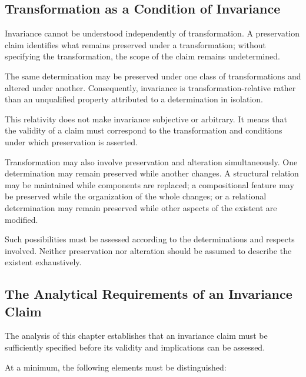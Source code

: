 \subsection{Transformation as a Condition of Invariance}

Invariance cannot be understood independently of
transformation. A preservation claim identifies what
remains preserved under a transformation; without
specifying the transformation, the scope of the
claim remains undetermined.

The same determination may be preserved under one
class of transformations and altered under another.
Consequently, invariance is transformation-relative
rather than an unqualified property attributed to
a determination in isolation.

This relativity does not make invariance subjective
or arbitrary. It means that the validity of a claim
must correspond to the transformation and conditions
under which preservation is asserted.

Transformation may also involve preservation and
alteration simultaneously. One determination may
remain preserved while another changes. A structural
relation may be maintained while components are
replaced; a compositional feature may be preserved
while the organization of the whole changes; or
a relational determination may remain preserved
while other aspects of the existent are modified.

Such possibilities must be assessed according to
the determinations and respects involved. Neither
preservation nor alteration should be assumed to
describe the existent exhaustively.

\subsection{The Analytical Requirements of an Invariance Claim}

The analysis of this chapter establishes that an
invariance claim must be sufficiently specified
before its validity and implications can be assessed.

At a minimum, the following elements must be
distinguished:

